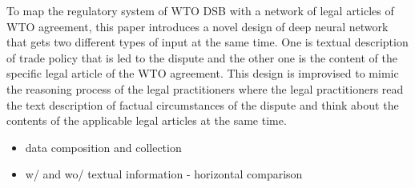 To map the regulatory system of WTO DSB with a network of legal articles of WTO agreement,
this paper introduces a novel design of deep neural network \citep{DBLP:journals/corr/Schmidhuber14} that
gets two different types of input at the same time.
One is textual description of trade policy that is led to the dispute and
the other one is the content of the specific legal article of the WTO agreement.
This design is improvised to mimic
the reasoning process of the legal practitioners
where the legal practitioners read
the text description of
factual circumstances of the dispute and think about the contents of
the applicable legal articles at the same time.

\begin{itemize}
    \item data composition and collection
    \item w/ and wo/ textual information - horizontal comparison
\end{itemize}


 

 
